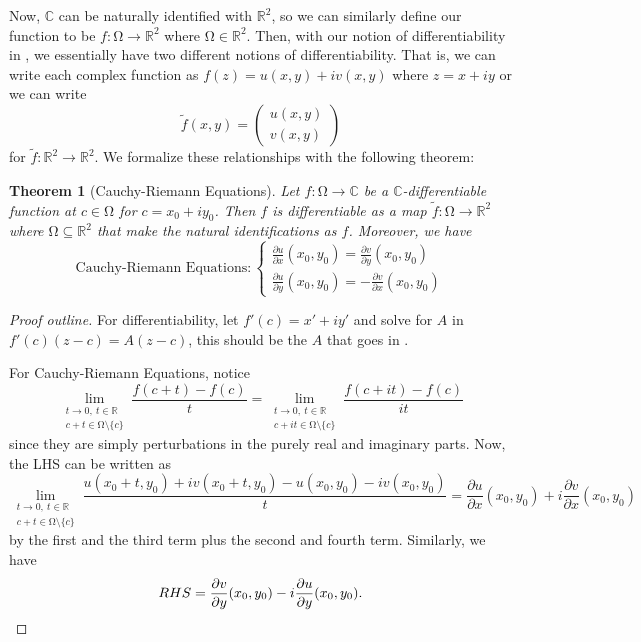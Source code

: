 \documentclass[letterpaper,12pt]{article}
\theoremstyle{definition}
\theoremstyle{plain}
\newtheorem{thm}{Theorem}[section]
\theoremstyle{remark}
\newcommand{\R}{\mathbb{R}}
\newcommand{\C}{\mathbb{C}}
\newcommand{\wt}{\widetilde}
\let\oldOmega\Omega
\renewcommand{\Omega}{\mathrm{\oldOmega}}
\begin{document}
Now, $\mathbb{C}$ can be naturally identified with $\R^2$, so we can similarly define our function to be $f:\Omega\to \mathbb{R}^2$ where $\Omega\in \R^2$. Then, with our notion of differentiability in , we essentially have two different notions of differentiability. That is, we can write each complex function as $f(z) = u(x,y) + iv(x,y)$ where $z=x+iy$ or we can write
\[\wt{f}(x,y) = \begin{pmatrix}
u(x,y) \\
v(x,y)
\end{pmatrix}\] 
for $\wt{f}:\R^2\to\R^2$. We formalize these relationships with the following theorem:

\begin{thm}[Cauchy-Riemann Equations]
Let $f:\Omega\to \C$ be a $\C$-differentiable function at $c\in \Omega$ for $c=x_0+iy_0$. Then $f$ is differentiable as a map $\wt{f}:\Omega\to \R^2$ where $\Omega\subseteq \R^2$ that make the natural identifications as $f$. Moreover, we have
\[\text{Cauchy-Riemann Equations}:\begin{cases}
\frac{\partial u}{\partial x}(x_0,y_0) = \frac{\partial v}{\partial y}(x_0,y_0) \\
\frac{\partial u}{\partial y}(x_0,y_0) = -\frac{\partial v}{\partial x}(x_0,y_0)
\end{cases}\]
\end{thm}

\begin{proof}[Proof outline]
For differentiability, let $f'(c)=x'+iy'$ and solve for $A$ in $f'(c)(z-c)=A(z-c)$, this should be the $A$ that goes in .

For Cauchy-Riemann Equations, notice
\[\lim_{\substack{t\to 0,\ t\in \R \\ c+t\in \Omega\setminus\{c\}}} \frac{f(c+t)-f(c)}{t} = \lim_{\substack{t\to 0,\ t\in \R \\ c+it\in \Omega\setminus\{c\}}} \frac{f(c+it)-f(c)}{it}\]
since they are simply perturbations in the purely real and imaginary parts. Now, the LHS can be written as
\[\lim_{\substack{t\to 0,\ t\in \R \\ c+t\in \Omega\setminus\{c\}}} \frac{u(x_0+t,y_0)+iv(x_0+t,y_0) - u(x_0,y_0) - iv(x_0,y_0)}{t} = \frac{\partial u}{\partial x}(x_0,y_0) + i \frac{\partial v}{\partial x}(x_0,y_0)\]
by the first and the third term plus the second and fourth term. Similarly, we have
\[RHS = \frac{\partial v}{\partial y}(x_0,y_0) - i \frac{\partial u}{\partial y}(x_0,y_0).\qedhere\]
\end{proof}
\end{document}
